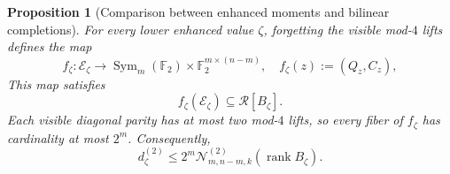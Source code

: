 \documentclass[11pt]{article}
\newcommand{\F}{\mathbb F}
\newcommand{\Sym}{\operatorname{Sym}}
\newcommand{\rank}{\operatorname{rank}}
\newcommand{\1}{\mathbf 1}
\theoremstyle{plain}
\newtheorem{proposition}[theorem]{Proposition}
\theoremstyle{definition}
\theoremstyle{remark}
\begin{document}
\begin{proposition}[Comparison between enhanced moments and bilinear completions]
\label{prop:binary-enhanced-bilinear-comparison}
For every lower enhanced value $\zeta$, forgetting the visible mod-$4$ lifts
defines the map
\begin{equation}
 f_\zeta:\mathcal E_\zeta\longrightarrow
          \Sym_m(\F_2)\times\F_2^{m\times(n-m)},
 \quad
 f_\zeta(z):=(Q_z,C_z),
 \label{eq:binary-enhanced-forgetful-map}
\end{equation}
This map satisfies
\begin{equation}
 f_\zeta(\mathcal E_\zeta)\subseteq\mathcal R[B_\zeta].
 \label{eq:binary-forgetful-image-in-completion-set}
\end{equation}
Each visible diagonal parity has at most two mod-$4$ lifts, so every fiber of
$f_\zeta$ has cardinality at most $2^m$.  Consequently,
\begin{equation}
 d_\zeta^{(2)}
 \le 2^m\mathcal N_{m,n-m,k}^{(2)}(\rank B_\zeta).
 \label{eq:binary-enhanced-support-completion-bound}
\end{equation}
\end{proposition}
\end{document}
